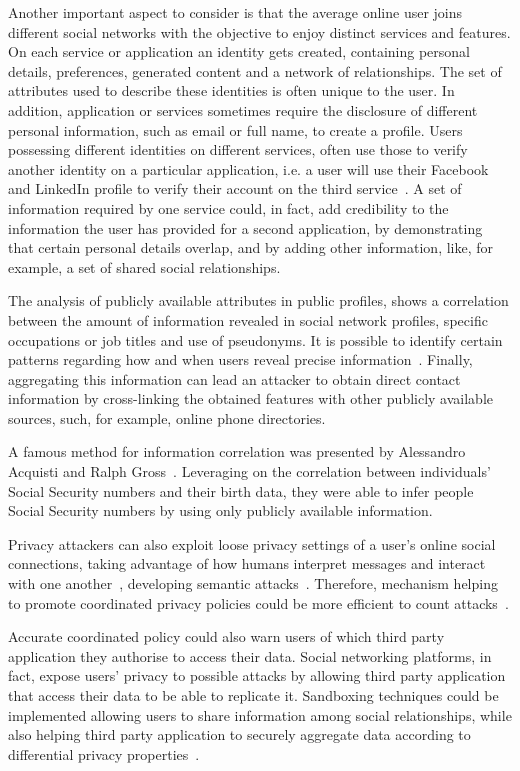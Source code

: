 Another important aspect to consider is that the average online user joins different social networks with the objective to enjoy distinct services and features. On each service or application an identity gets created, containing personal details, preferences, generated content and a network of relationships. The set of attributes used to describe these identities is often unique to the user. In addition, application or services sometimes require the disclosure of different personal information, such as email or full name, to create a profile. Users possessing different identities on different services, often use those to verify another identity on a particular application, i.e. a user will use their Facebook and LinkedIn profile to verify their account on the third service~\cite{paridhi-et-al}. A set of information required by one service could, in fact, add credibility to the information the user has provided for a second application, by demonstrating that certain personal details overlap, and by adding other information, like, for example, a set of shared social relationships.

The analysis of publicly available attributes in public profiles, shows a correlation between the amount of information revealed in social network profiles, specific occupations or job titles and use of pseudonyms. It is possible to identify certain patterns regarding how and when users reveal precise information~\cite{chen-et-al}. Finally, aggregating this information can lead an attacker to obtain direct contact information by cross-linking the obtained features with other publicly available sources, such, for example, online phone directories.

A famous method for information correlation was presented by Alessandro Acquisti and Ralph Gross~\cite{acquisti-et-al}. Leveraging on the correlation between individuals' Social Security numbers and their birth data, they were able to infer people Social Security numbers by using only publicly available information.

Privacy attackers can also exploit loose privacy settings of a user's online social connections, taking advantage of how humans interpret messages and interact with one another~\cite{cryto-gram}, developing semantic attacks~\cite{Kumaragur-et-all}. Therefore, mechanism helping to promote coordinated privacy policies could be more efficient to count attacks~\cite{brown-et-all}. 

Accurate coordinated policy could also warn users of which third party application they authorise to access their data. Social networking platforms, in fact, expose users' privacy to possible attacks by allowing third party application that access their data to be able to replicate it. Sandboxing techniques could be implemented allowing users to share information among social relationships, while also helping third party application to securely aggregate data according to differential privacy properties~\cite{viswanath2012keeping}. 

